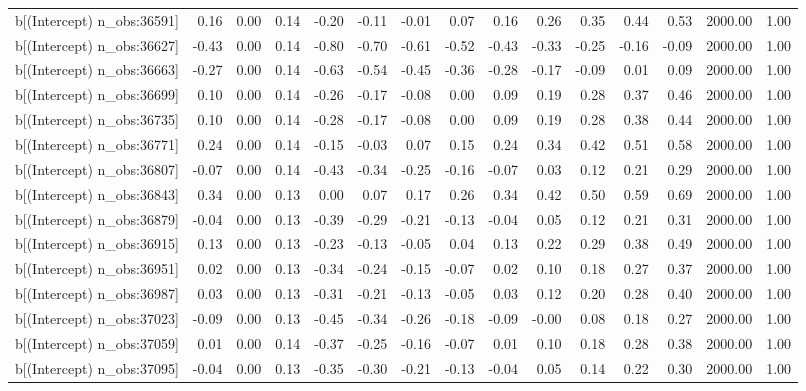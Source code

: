 \begin{table}[ht]
\begin{tabular}{rrrrrrrrrrrrrrr}
  b[(Intercept) n\_obs:36591] & 0.16 & 0.00 & 0.14 & -0.20 & -0.11 & -0.01 & 0.07 & 0.16 & 0.26 & 0.35 & 0.44 & 0.53 & 2000.00 & 1.00 \\ 
  b[(Intercept) n\_obs:36627] & -0.43 & 0.00 & 0.14 & -0.80 & -0.70 & -0.61 & -0.52 & -0.43 & -0.33 & -0.25 & -0.16 & -0.09 & 2000.00 & 1.00 \\ 
  b[(Intercept) n\_obs:36663] & -0.27 & 0.00 & 0.14 & -0.63 & -0.54 & -0.45 & -0.36 & -0.28 & -0.17 & -0.09 & 0.01 & 0.09 & 2000.00 & 1.00 \\ 
  b[(Intercept) n\_obs:36699] & 0.10 & 0.00 & 0.14 & -0.26 & -0.17 & -0.08 & 0.00 & 0.09 & 0.19 & 0.28 & 0.37 & 0.46 & 2000.00 & 1.00 \\ 
  b[(Intercept) n\_obs:36735] & 0.10 & 0.00 & 0.14 & -0.28 & -0.17 & -0.08 & 0.00 & 0.09 & 0.19 & 0.28 & 0.38 & 0.44 & 2000.00 & 1.00 \\ 
  b[(Intercept) n\_obs:36771] & 0.24 & 0.00 & 0.14 & -0.15 & -0.03 & 0.07 & 0.15 & 0.24 & 0.34 & 0.42 & 0.51 & 0.58 & 2000.00 & 1.00 \\ 
  b[(Intercept) n\_obs:36807] & -0.07 & 0.00 & 0.14 & -0.43 & -0.34 & -0.25 & -0.16 & -0.07 & 0.03 & 0.12 & 0.21 & 0.29 & 2000.00 & 1.00 \\ 
  b[(Intercept) n\_obs:36843] & 0.34 & 0.00 & 0.13 & 0.00 & 0.07 & 0.17 & 0.26 & 0.34 & 0.42 & 0.50 & 0.59 & 0.69 & 2000.00 & 1.00 \\ 
  b[(Intercept) n\_obs:36879] & -0.04 & 0.00 & 0.13 & -0.39 & -0.29 & -0.21 & -0.13 & -0.04 & 0.05 & 0.12 & 0.21 & 0.31 & 2000.00 & 1.00 \\ 
  b[(Intercept) n\_obs:36915] & 0.13 & 0.00 & 0.13 & -0.23 & -0.13 & -0.05 & 0.04 & 0.13 & 0.22 & 0.29 & 0.38 & 0.49 & 2000.00 & 1.00 \\ 
  b[(Intercept) n\_obs:36951] & 0.02 & 0.00 & 0.13 & -0.34 & -0.24 & -0.15 & -0.07 & 0.02 & 0.10 & 0.18 & 0.27 & 0.37 & 2000.00 & 1.00 \\ 
  b[(Intercept) n\_obs:36987] & 0.03 & 0.00 & 0.13 & -0.31 & -0.21 & -0.13 & -0.05 & 0.03 & 0.12 & 0.20 & 0.28 & 0.40 & 2000.00 & 1.00 \\ 
  b[(Intercept) n\_obs:37023] & -0.09 & 0.00 & 0.13 & -0.45 & -0.34 & -0.26 & -0.18 & -0.09 & -0.00 & 0.08 & 0.18 & 0.27 & 2000.00 & 1.00 \\ 
  b[(Intercept) n\_obs:37059] & 0.01 & 0.00 & 0.14 & -0.37 & -0.25 & -0.16 & -0.07 & 0.01 & 0.10 & 0.18 & 0.28 & 0.38 & 2000.00 & 1.00 \\ 
  b[(Intercept) n\_obs:37095] & -0.04 & 0.00 & 0.13 & -0.35 & -0.30 & -0.21 & -0.13 & -0.04 & 0.05 & 0.14 & 0.22 & 0.30 & 2000.00 & 1.00 \\ 

\end{tabular}
\end{table}
